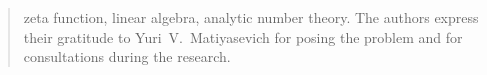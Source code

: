 \documentclass[intlimits,twoside,a4paper,11pt]{article}
\begin{document}
\begin{translatedpart}
\begin{abstract}
            \keywords zeta function, linear algebra, analytic number theory.
            \autocitationexample
            \acknowledgements The authors express their gratitude to Yuri~V.~Matiyasevich for posing the problem and for consultations during the research.
        \end{abstract}

        


    \end{translatedpart}

    
\end{document}

